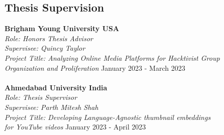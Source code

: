 \documentclass[margin, centered,lmodern]{res}
\begin{document}
\begin{resume}
\section{Thesis Supervision}

\textbf{Brigham Young University USA} \\
\emph{Role: Honors Thesis Advisor \\Supervisee: Quincy Taylor \\ Project Title: Analyzing Online Media Platforms for Hacktivist Group \\Organization and Proliferation} \hfill January 2023 -  March 2023 \\ \\
\textbf{Ahmedabad University India} \\ 
\emph{Role: Thesis Supervisor \\ Supervisee: Parth Mitesh Shah \\ Project Title: Developing Language-Agnostic thumbnail embeddings\\for YouTube videos} \hfill January 2023 -  April 2023 \\


\end{resume}
\end{document}
